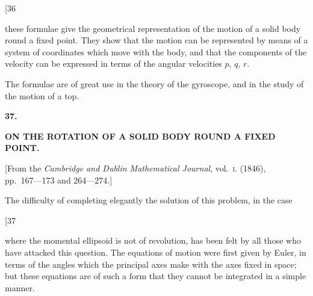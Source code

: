 \documentclass[11pt,a4paper]{book}
\begin{document}
\newpage
\setcounter{page}{237}

\begin{center}
{\small [36}
\end{center}
\vspace{-1em}

these formulae give the geometrical representation of the motion of a solid body
round a fixed point. They show that the motion can be represented by means of
a system of coordinates which move with the body, and that the components of the
velocity can be expressed in terms of the angular velocities $p$, $q$, $r$.

The formulae are of great use in the theory of the gyroscope, and in the study
of the motion of a top.


\newpage
{}
\setcounter{page}{237}

\begin{center}
{\large\bfseries 37.}
\end{center}
\vspace{0.5em}
\begin{center}
{\large\bfseries ON THE ROTATION OF A SOLID BODY ROUND A FIXED\\[0.3em]
POINT.}
\end{center}
\vspace{0.5em}
\begin{center}
{[From the \textit{Cambridge and Dublin Mathematical Journal}, vol.~\textsc{i}. (1846),\\
pp.~167---173 and 264---274.]}
\end{center}
\vspace{1em}

The difficulty of completing elegantly the solution of this problem, in the case

\newpage
\setcounter{page}{238}

\begin{center}
{\small [37}
\end{center}
\vspace{-1em}

where the momental ellipsoid is not of revolution, has been felt by all those who have
attacked this question. The equations of motion were first given by Euler, in terms
of the angles which the principal axes make with the axes fixed in space; but these
equations are of such a form that they cannot be integrated in a simple manner.
\end{document}
